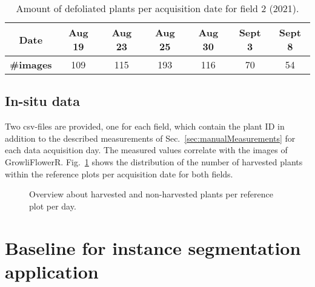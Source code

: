 \documentclass{article}
\def\secref#1{Sec.~\ref{#1}}
\def\figref#1{Fig.~\ref{#1}}
\begin{document}
\begin{table}[t]
    \centering
    \begin{tabular}{c|c|c|c|c|c|c}
        \textbf{Date} & Aug 19 & Aug 23  & Aug 25 & Aug 30 & Sept 3 & Sept 8 \\
        \hline
        \textbf{\#images} & 109  & 115 & 193 & 116 & 70 & 54 \\
    \end{tabular}
    \caption{Amount of defoliated plants per acquisition date for field 2 (2021).}
    \label{table:imageDefPlants}
\end{table}



\subsection{In-situ data}

Two csv-files are provided, one for each field, which contain the plant ID in addition to the described measurements of \secref{sec:manualMeasurements} for each data acquisition day. The measured values correlate with the images of GrowliFlowerR.
\figref{fig:harvestDays} shows the distribution of the number of harvested plants within the reference plots per acquisition date for both fields.

\begin{figure}[t]
	\centering
    
    \caption{Overview about harvested and non-harvested plants per reference plot per day.}
	\label{fig:harvestDays}
\end{figure}








\section{Baseline for instance segmentation application} \label{sec:results}
\end{document}

